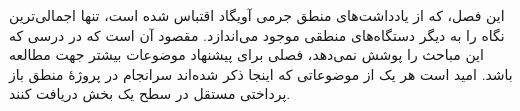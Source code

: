\documentclass[../../../include/open-logic-chapter]{subfiles}
\begin{document}

\begin{editorial}
  این فصل، که از یادداشت‌های منطق جرمی آویگاد اقتباس شده است، تنها
  اجمالی‌ترین نگاه را به دیگر دستگاه‌های منطقی موجود می‌اندازد. مقصود
  آن است که در درسی که این مباحث را پوشش نمی‌دهد، فصلی برای پیشنهاد
  موضوعات بیشتر جهت مطالعه باشد. امید است هر یک از موضوعاتی که اینجا
  ذکر شده‌اند سرانجام در پروژهٔ منطق باز پرداختی مستقل در سطح یک بخش
  دریافت کنند.
\end{editorial}








\OLEndChapterHook
\end{document}
